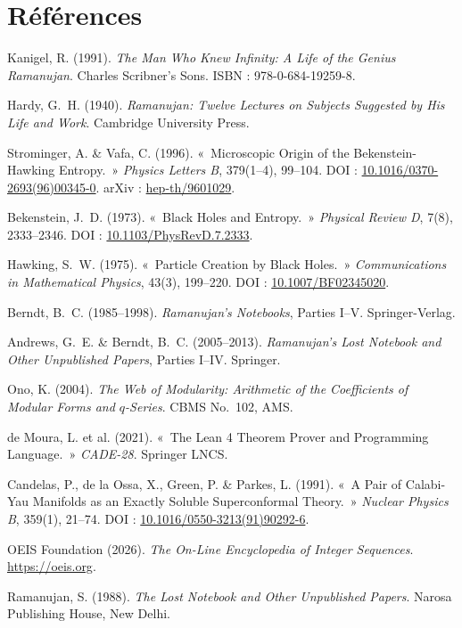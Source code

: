 \documentclass[11pt,a4paper]{article}
\begin{document}
\section*{Références}
\small
\begin{enumerate}[leftmargin=2em, label={[\arabic*]}]
    \item Kanigel, R. (1991). \textit{The Man Who Knew Infinity: A Life of the Genius Ramanujan}. Charles Scribner's Sons. ISBN : 978-0-684-19259-8.
    \item Hardy, G.~H. (1940). \textit{Ramanujan: Twelve Lectures on Subjects Suggested by His Life and Work}. Cambridge University Press.
    \item Strominger, A. \& Vafa, C. (1996). «~Microscopic Origin of the Bekenstein-Hawking Entropy.~» \textit{Physics Letters B}, 379(1--4), 99--104. DOI : \href{https://doi.org/10.1016/0370-2693(96)00345-0}{10.1016/0370-2693(96)00345-0}. arXiv : \href{https://arxiv.org/abs/hep-th/9601029}{hep-th/9601029}.
    \item Bekenstein, J.~D. (1973). «~Black Holes and Entropy.~» \textit{Physical Review D}, 7(8), 2333--2346. DOI : \href{https://doi.org/10.1103/PhysRevD.7.2333}{10.1103/PhysRevD.7.2333}.
    \item Hawking, S.~W. (1975). «~Particle Creation by Black Holes.~» \textit{Communications in Mathematical Physics}, 43(3), 199--220. DOI : \href{https://doi.org/10.1007/BF02345020}{10.1007/BF02345020}.
    \item Berndt, B.~C. (1985--1998). \textit{Ramanujan's Notebooks}, Parties I--V. Springer-Verlag.
    \item Andrews, G.~E. \& Berndt, B.~C. (2005--2013). \textit{Ramanujan's Lost Notebook and Other Unpublished Papers}, Parties I--IV. Springer.
    \item Ono, K. (2004). \textit{The Web of Modularity: Arithmetic of the Coefficients of Modular Forms and $q$-Series}. CBMS No.~102, AMS.
    \item de Moura, L. et al. (2021). «~The Lean 4 Theorem Prover and Programming Language.~» \textit{CADE-28}. Springer LNCS.
    \item Candelas, P., de la Ossa, X., Green, P. \& Parkes, L. (1991). «~A Pair of Calabi-Yau Manifolds as an Exactly Soluble Superconformal Theory.~» \textit{Nuclear Physics B}, 359(1), 21--74. DOI : \href{https://doi.org/10.1016/0550-3213(91)90292-6}{10.1016/0550-3213(91)90292-6}.
    \item OEIS Foundation (2026). \textit{The On-Line Encyclopedia of Integer Sequences}. \url{https://oeis.org}.
    \item Ramanujan, S. (1988). \textit{The Lost Notebook and Other Unpublished Papers}. Narosa Publishing House, New Delhi.
\end{enumerate}
\end{document}
